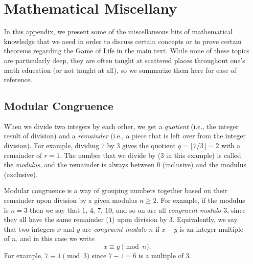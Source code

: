
\renewcommand{\chapterfolder}{appendices/}

\chapter{Mathematical Miscellany}\label{app:math}

In this appendix, we present some of the miscellaneous bits of mathematical knowledge that we need in order to discuss certain concepts or to prove certain theorems regarding the Game of Life in the main text. While none of these topics are particularly deep, they are often taught at scattered places throughout one's math education (or not taught at all), so we summarize them here for ease of reference.


\section{Modular Congruence}\label{sec:modular_arithmetic}

When we divide two integers by each other, we get a \emph{quotient} (i.e., the integer result of division) and a \emph{remainder} (i.e., a piece that is left over from the integer division). For example, dividing $7$ by $3$ gives the quotient $q = \lfloor 7/3 \rfloor = 2$ with a remainder of $r = 1$. The number that we divide by ($3$ in this example) is called the \emph{modulus}, and the remainder is always between $0$ (inclusive) and the modulus (exclusive).

Modular congruence is a way of grouping numbers together based on their remainder upon division by a given modulus $n \geq 2$. For example, if the modulus is $n = 3$ then we say that $1$, $4$, $7$, $10$, and so on are all \emph{congruent modulo $3$}, since they all have the same remainder ($1$) upon division by $3$. Equivalently, we say that two integers $x$ and $y$ are \emph{congruent modulo $n$} if $x-y$ is an integer multiple of $n$, and in this case we write
\[
	x \equiv y \pmod{n}.
\]
For example, $7 \equiv 1 \pmod{3}$ since $7 - 1 = 6$ is a multiple of $3$.

